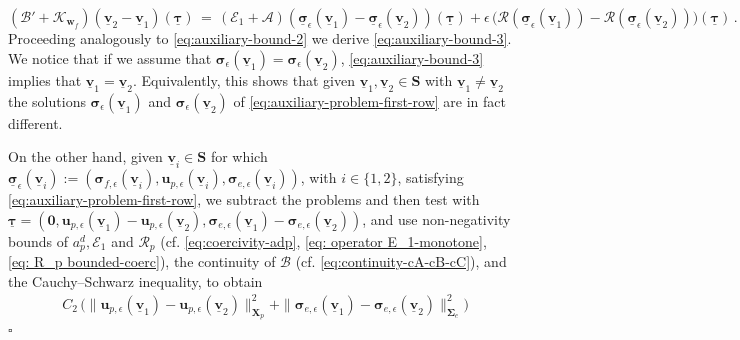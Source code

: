 \documentclass[11pt]{article}
\numberwithin{equation}{section}
\newcommand{\bsi}{{\boldsymbol\sigma}}
\newcommand{\bSigma}{{\boldsymbol\Sigma}}
\newcommand{\btau}{{\boldsymbol\tau}}
\newcommand{\ubsi}{\underline{\bsi}}
\newcommand{\ubtau}{\underline{\btau}}
\newcommand{\ubv}{\underline{\bv}}
\newcommand{\bv}{{\mathbf{v}}}
\newcommand{\bw}{{\mathbf{w}}}
\newcommand{\bu}{\mathbf{u}}
\newcommand{\0}{{\mathbf{0}}}
\def\bX{\mathbf{X}}
\def\bS{\mathbf{S}}
\newcommand{\cA}{\mathcal{A}}
\newcommand{\cB}{\mathcal{B}}
\newcommand{\cE}{\mathcal{E}}
\newcommand{\cK}{\mathcal{K}}
\newcommand{\cR}{\mathcal{R}}
\newenvironment{proof}{\noindent{\it Proof.}}{\hfill$\square$}
\numberwithin{equation}{section}
\begin{document}
\begin{proof}
\begin{equation}\label{eq:identity-E1-A-R-2}
(\cB' + \cK_{\bw_f})(\ubv_2 - \ubv_1)(\ubtau) \,=\, (\cE_1 + \cA)(\ubsi_\epsilon(\ubv_1) - \ubsi_\epsilon(\ubv_2))(\ubtau) + \epsilon\,\big(\cR(\ubsi_\epsilon(\ubv_1)) - \cR(\ubsi_\epsilon(\ubv_2))\big)(\ubtau)\,.
\end{equation}
Proceeding analogously to \eqref{eq:auxiliary-bound-2} we derive \eqref{eq:auxiliary-bound-3}.
We notice that if we assume that $\bsi_\epsilon(\ubv_1) = \bsi_\epsilon(\ubv_2)$, \eqref{eq:auxiliary-bound-3} implies that $\ubv_1 = \ubv_2$.
Equivalently, this shows that given $\ubv_1, \ubv_2\in \bS$ with $\ubv_1 \neq \ubv_2$ the solutions $\bsi_\epsilon(\ubv_1)$ and $\bsi_\epsilon(\ubv_2)$ of \eqref{eq:auxiliary-problem-first-row} are in fact different. 

On the other hand, given $\ubv_i\in \bS$ for which $\ubsi_\epsilon(\ubv_i) := (\bsi_{f,\epsilon}(\ubv_i),\bu_{p,\epsilon}(\ubv_i),\bsi_{e,\epsilon}(\ubv_i))$, with $i\in \{1,2\}$, satisfying \eqref{eq:auxiliary-problem-first-row}, we subtract the problems and then test with $\ubtau = (\0,\bu_{p,\epsilon}(\ubv_1) - \bu_{p,\epsilon}(\ubv_2), \bsi_{e,\epsilon}(\ubv_1) - \bsi_{e,\epsilon}(\ubv_2))$, 
and use non-negativity bounds of $a^d_p, \cE_1$ and $\cR_p$ (cf. \eqref{eq:coercivity-adp}, \eqref{eq: operator E_1-monotone}, \eqref{eq: R_p bounded-coerc}), the continuity of $\cB$ (cf. \eqref{eq:continuity-cA-cB-cC}), and the Cauchy--Schwarz inequality, to obtain
\begin{align*}
&C_2\,\Big(\|\bu_{p,\epsilon}(\ubv_1) - \bu_{p,\epsilon}(\ubv_2)\|^2_{\bX_p}
+ \|\bsi_{e,\epsilon}(\ubv_1) - \bsi_{e,\epsilon}(\ubv_2)\|^2_{\bSigma_e} \Big) \nonumber \\

\end{align*}
\end{proof}
\end{document}
